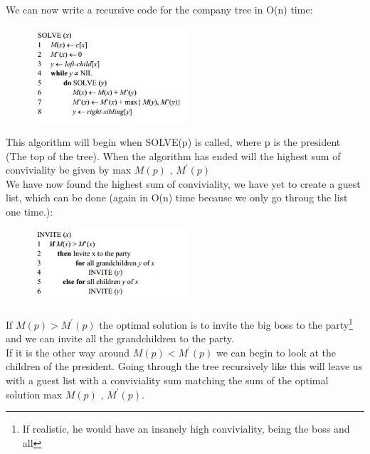 \documentclass{article}
\begin{document}
We can now write a recursive code for the company tree in O(n) time:
\begin{figure}[H]
  \centering
    \includegraphics[width=0.50\textwidth]{Koala.jpg}
\end{figure}
This algorithm will begin when SOLVE(p) is called, where p is the president (The top of the tree). When the algorithm has ended will the highest sum of conviviality be given by $ \text{max } {M(p) \text{ , } M^{'}(p)} $\\
We have now found the highest sum of conviviality, we have yet to create a guest list, which can be done (again in O(n) time because we only go throug the list one time.):
\begin{figure}[H]
  \centering
    \includegraphics[width=0.50\textwidth]{hest.jpg}
\end{figure}
If $ M(p) > M^{'}(p) $ the optimal solution is to invite the big boss to the party\footnote{If realistic, he would have an insanely high conviviality, being the boss and all} and we can invite all the grandchildren to the party.\\
If it is the other way around $ M(p) < M^{'}(p) $ we can begin to look at the children of the president. Going through the tree recursively like this will leave us with a guest list with a conviviality sum matching the sum of the optimal solution $ \text{max } {M(p) \text{ , } M^{'}(p)} $.
\end{document}
